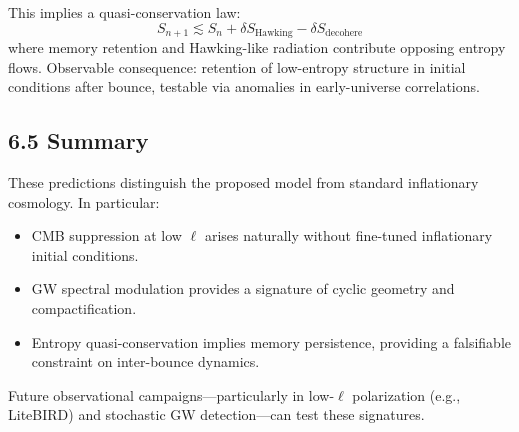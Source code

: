 This implies a quasi-conservation law:
\[
S_{n+1} \lesssim S_n + \delta S_{\text{Hawking}} - \delta S_{\text{decohere}}
\]
where memory retention and Hawking-like radiation contribute opposing entropy flows. Observable consequence: retention of low-entropy structure in initial conditions after bounce, testable via anomalies in early-universe correlations.

\subsection*{6.5 Summary}

These predictions distinguish the proposed model from standard inflationary cosmology. In particular:
\begin{itemize}
    \item CMB suppression at low \( \ell \) arises naturally without fine-tuned inflationary initial conditions.
    \item GW spectral modulation provides a signature of cyclic geometry and compactification.
    \item Entropy quasi-conservation implies memory persistence, providing a falsifiable constraint on inter-bounce dynamics.
\end{itemize}

Future observational campaigns—particularly in low-\( \ell \) polarization (e.g., LiteBIRD) and stochastic GW detection—can test these signatures.


